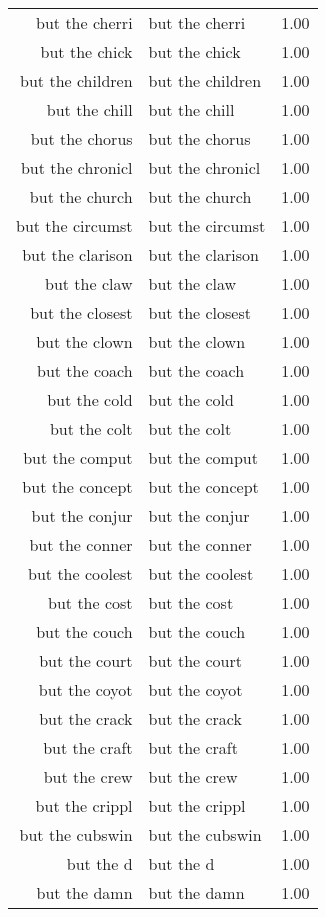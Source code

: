\begin{table}[ht]
\begin{tabular}{rlr}
  but the cherri & but the cherri & 1.00 \\ 
  but the chick & but the chick & 1.00 \\ 
  but the children & but the children & 1.00 \\ 
  but the chill & but the chill & 1.00 \\ 
  but the chorus & but the chorus & 1.00 \\ 
  but the chronicl & but the chronicl & 1.00 \\ 
  but the church & but the church & 1.00 \\ 
  but the circumst & but the circumst & 1.00 \\ 
  but the clarison & but the clarison & 1.00 \\ 
  but the claw & but the claw & 1.00 \\ 
  but the closest & but the closest & 1.00 \\ 
  but the clown & but the clown & 1.00 \\ 
  but the coach & but the coach & 1.00 \\ 
  but the cold & but the cold & 1.00 \\ 
  but the colt & but the colt & 1.00 \\ 
  but the comput & but the comput & 1.00 \\ 
  but the concept & but the concept & 1.00 \\ 
  but the conjur & but the conjur & 1.00 \\ 
  but the conner & but the conner & 1.00 \\ 
  but the coolest & but the coolest & 1.00 \\ 
  but the cost & but the cost & 1.00 \\ 
  but the couch & but the couch & 1.00 \\ 
  but the court & but the court & 1.00 \\ 
  but the coyot & but the coyot & 1.00 \\ 
  but the crack & but the crack & 1.00 \\ 
  but the craft & but the craft & 1.00 \\ 
  but the crew & but the crew & 1.00 \\ 
  but the crippl & but the crippl & 1.00 \\ 
  but the cubswin & but the cubswin & 1.00 \\ 
  but the d & but the d & 1.00 \\ 
  but the damn & but the damn & 1.00 \\ 

\end{tabular}
\end{table}
